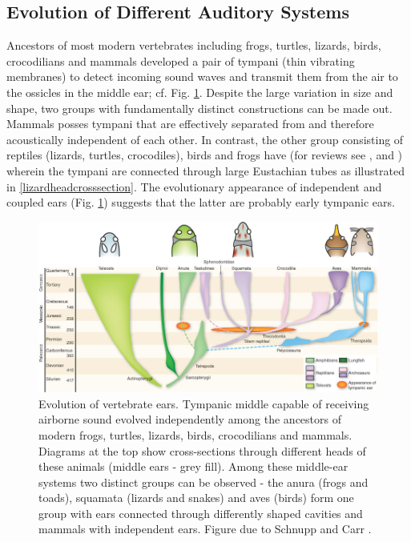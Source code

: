 \subsection{Evolution of Different Auditory Systems}\label{auditoryevolution}
Ancestors of most modern vertebrates including frogs, turtles, lizards, birds, crocodilians and mammals
developed a pair of tympani (thin vibrating membranes) to detect incoming sound waves and transmit
them from the air to the ossicles in the middle ear; cf. Fig. \ref{vertebrateearevolution}. 
Despite the large variation in size and shape, two groups with fundamentally distinct constructions can be
made out. Mammals posses tympani that are effectively separated from and therefore acoustically 
independent of each other. In contrast, the other group consisting of reptiles (lizards, turtles, crocodiles), birds and frogs
have  (for reviews see \cite{carrsoares}, \cite{dalsgaardcarr} and \cite{schnuppcarr}) wherein
the tympani are connected through large Eustachian tubes as illustrated in \ref{lizardheadcrosssection}. The evolutionary 
appearance of independent and coupled ears (Fig. \ref{vertebrateearevolution}) suggests that the latter are probably early
tympanic ears.
\begin{figure}[ht!]
 \includegraphics[width=1.0\linewidth]{Diagrams/vertebrateearevolution.jpg}
 \caption[Vertebrate Ear Evolution]{Evolution of vertebrate ears. Tympanic
 middle capable of receiving airborne sound evolved independently among the ancestors of modern frogs, turtles, lizards, birds,
 crocodilians and mammals. Diagrams at the top show cross-sections through different heads of these animals (middle ears - grey fill).
 Among these middle-ear systems two distinct groups can be observed - the anura (frogs and toads), squamata (lizards and snakes)
 and aves (birds) form one group with ears connected through differently shaped cavities and mammals with independent ears. Figure due to Schnupp and Carr \cite{schnuppcarr}.}
 \label{vertebrateearevolution}
\end{figure}

